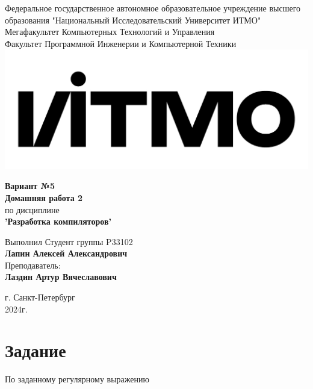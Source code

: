 \documentclass[12pt,onecolumn]{article}
\begin{document}
\setcounter{tocdepth}{4}
\begin{center}
    Федеральное государственное автономное образовательное учреждение высшего образования "Национальный Исследовательский Университет ИТМО"\\ 
    Мегафакультет Компьютерных Технологий и Управления\\
    Факультет Программной Инженерии и Компьютерной Техники \\
    \includegraphics[scale=0.3]{image/itmo.jpg} %
\end{center}
\vspace{1cm}


\begin{center}
    \large \textbf{Вариант №5}\\
    \textbf{Домашняя работа 2}\\
    по дисциплине\\
    \textbf{'Разработка компиляторов'}
\end{center}

\vspace{2cm}

\begin{flushright}
  Выполнил Студент  группы P33102\\
  \textbf{Лапин Алексей Александрович}\\
  Преподаватель: \\
  \textbf{Лаздин Артур Вячеславович}\\
\end{flushright}

\vspace{9cm}
\begin{center}
    г. Санкт-Петербург\\
    2024г.
\end{center}
\pagestyle{empty}


\section*{Задание}
По заданному регулярному выражению
\end{document}
